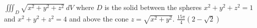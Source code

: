 {$\iiint_D \sqrt{x^2 + y^2 + z^2} \: dV$ where $D$ is the solid between the spheres $x^2 + y^2 + z^2 = 1$ and $x^2 + y^2 + z^2 = 4$ and above the cone $z = \sqrt{x^2 + y^2}$. 
}
{$\frac{15\pi}{4}\left(2 - \sqrt{2} \right)$}